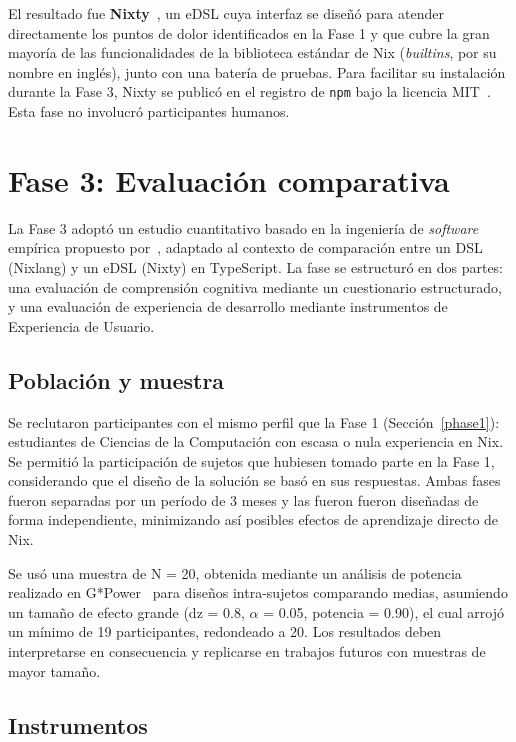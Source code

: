 El resultado fue \textbf{Nixty}~\cite{rayoNixtyGenerateNix2026}, un eDSL cuya interfaz se diseñó para atender directamente los puntos de dolor identificados en la Fase 1 y que cubre la gran mayoría de las funcionalidades de la biblioteca estándar de Nix (\emph{builtins}, por su nombre en inglés), junto con una batería de pruebas. Para facilitar su instalación durante la Fase 3, Nixty se publicó en el registro de \texttt{npm} bajo la licencia MIT~\cite{MITLicense}. Esta fase no involucró participantes humanos.

\section{Fase 3: Evaluación comparativa}

La Fase 3 adoptó un estudio cuantitativo basado en la ingeniería de \emph{software} empírica
propuesto por~\cite{mernikPDFComparisonXAML2009}, adaptado al contexto de
comparación entre un DSL (Nixlang) y un eDSL (Nixty) en TypeScript. La fase se estructuró en dos partes: una evaluación de comprensión cognitiva mediante un cuestionario estructurado, y una evaluación de experiencia de desarrollo mediante instrumentos de Experiencia de Usuario.

\subsection{Población y muestra}

Se reclutaron participantes con el mismo perfil que la Fase 1 (Sección~\ref{phase1}): estudiantes de Ciencias de la Computación con escasa o nula experiencia en Nix. Se permitió la participación de sujetos que hubiesen tomado parte en la Fase 1, considerando que el diseño de la solución se basó en sus respuestas. Ambas fases fueron separadas por un período de 3 meses y las fueron fueron diseñadas de forma independiente, minimizando así posibles efectos de aprendizaje directo de Nix.

Se usó una muestra de N = 20, obtenida mediante un análisis de potencia realizado en G*Power~\cite{GPower} para diseños intra-sujetos comparando medias, asumiendo un tamaño de efecto grande (dz = 0.8, $\alpha$ = 0.05, potencia = 0.90), el cual arrojó un mínimo de 19 participantes, redondeado a 20. Los resultados deben interpretarse en consecuencia y replicarse en trabajos futuros con muestras de mayor tamaño.

\subsection{Instrumentos}


